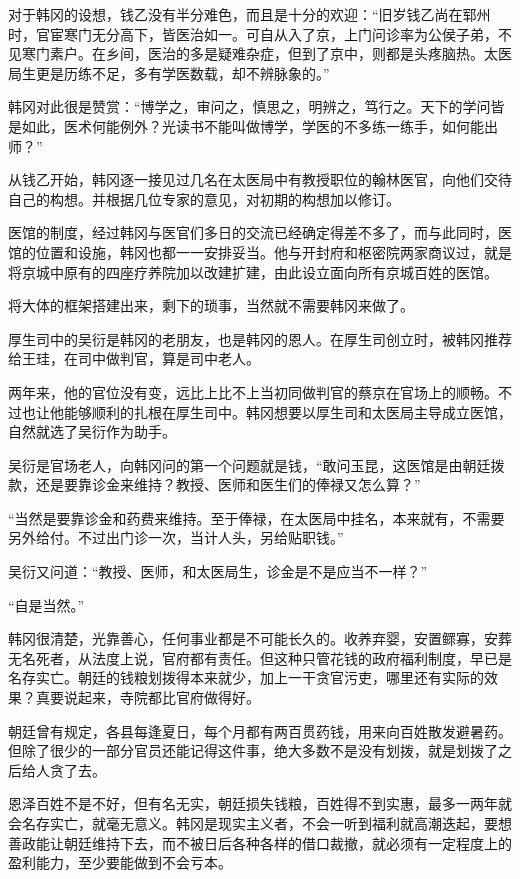 对于韩冈的设想，钱乙没有半分难色，而且是十分的欢迎：“旧岁钱乙尚在郓州时，官宦寒门无分高下，皆医治如一。可自从入了京，上门问诊率为公侯子弟，不见寒门素户。在乡间，医治的多是疑难杂症，但到了京中，则都是头疼脑热。太医局生更是历练不足，多有学医数载，却不辨脉象的。”

韩冈对此很是赞赏：“博学之，审问之，慎思之，明辨之，笃行之。天下的学问皆是如此，医术何能例外？光读书不能叫做博学，学医的不多练一练手，如何能出师？”

从钱乙开始，韩冈逐一接见过几名在太医局中有教授职位的翰林医官，向他们交待自己的构想。并根据几位专家的意见，对初期的构想加以修订。

医馆的制度，经过韩冈与医官们多日的交流已经确定得差不多了，而与此同时，医馆的位置和设施，韩冈也都一一安排妥当。他与开封府和枢密院两家商议过，就是将京城中原有的四座疗养院加以改建扩建，由此设立面向所有京城百姓的医馆。

将大体的框架搭建出来，剩下的琐事，当然就不需要韩冈来做了。

厚生司中的吴衍是韩冈的老朋友，也是韩冈的恩人。在厚生司创立时，被韩冈推荐给王珪，在司中做判官，算是司中老人。

两年来，他的官位没有变，远比上比不上当初同做判官的蔡京在官场上的顺畅。不过也让他能够顺利的扎根在厚生司中。韩冈想要以厚生司和太医局主导成立医馆，自然就选了吴衍作为助手。

吴衍是官场老人，向韩冈问的第一个问题就是钱，“敢问玉昆，这医馆是由朝廷拨款，还是要靠诊金来维持？教授、医师和医生们的俸禄又怎么算？”

“当然是要靠诊金和药费来维持。至于俸禄，在太医局中挂名，本来就有，不需要另外给付。不过出门诊一次，当计人头，另给贴职钱。”

吴衍又问道：“教授、医师，和太医局生，诊金是不是应当不一样？”

“自是当然。”

韩冈很清楚，光靠善心，任何事业都是不可能长久的。收养弃婴，安置鳏寡，安葬无名死者，从法度上说，官府都有责任。但这种只管花钱的政府福利制度，早已是名存实亡。朝廷的钱粮划拨得本来就少，加上一干贪官污吏，哪里还有实际的效果？真要说起来，寺院都比官府做得好。

朝廷曾有规定，各县每逢夏日，每个月都有两百贯药钱，用来向百姓散发避暑药。但除了很少的一部分官员还能记得这件事，绝大多数不是没有划拨，就是划拨了之后给人贪了去。

恩泽百姓不是不好，但有名无实，朝廷损失钱粮，百姓得不到实惠，最多一两年就会名存实亡，就毫无意义。韩冈是现实主义者，不会一听到福利就高潮迭起，要想善政能让朝廷维持下去，而不被日后各种各样的借口裁撤，就必须有一定程度上的盈利能力，至少要能做到不会亏本。


